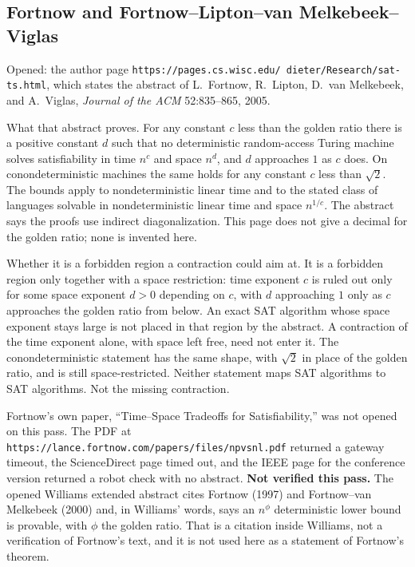 \documentclass{article}
\begin{document}
\subsection{Fortnow and Fortnow--Lipton--van Melkebeek--Viglas}
Opened: the author page \texttt{https://pages.cs.wisc.edu/~dieter/Research/sat-ts.html}, which states the abstract of L.~Fortnow, R.~Lipton, D.~van Melkebeek, and A.~Viglas, \emph{Journal of the ACM} 52:835--865, 2005.

What that abstract proves.
For any constant \(c\) less than the golden ratio there is a positive constant \(d\) such that no deterministic random-access Turing machine solves satisfiability in time \(n^c\) and space \(n^d\), and \(d\) approaches \(1\) as \(c\) does.
On conondeterministic machines the same holds for any constant \(c\) less than \(\sqrt{2}\).
The bounds apply to nondeterministic linear time and to the stated class of languages solvable in nondeterministic linear time and space \(n^{1/c}\).
The abstract says the proofs use indirect diagonalization.
This page does not give a decimal for the golden ratio; none is invented here.

Whether it is a forbidden region a contraction could aim at.
It is a forbidden region only together with a space restriction: time exponent \(c\) is ruled out only for some space exponent \(d>0\) depending on \(c\), with \(d\) approaching \(1\) only as \(c\) approaches the golden ratio from below.
An exact SAT algorithm whose space exponent stays large is not placed in that region by the abstract.
A contraction of the time exponent alone, with space left free, need not enter it.
The conondeterministic statement has the same shape, with \(\sqrt{2}\) in place of the golden ratio, and is still space-restricted.
Neither statement maps SAT algorithms to SAT algorithms.
Not the missing contraction.

Fortnow's own paper, ``Time--Space Tradeoffs for Satisfiability,'' was not opened on this pass.
The PDF at \texttt{https://lance.fortnow.com/papers/files/npvsnl.pdf} returned a gateway timeout, the ScienceDirect page timed out, and the IEEE page for the conference version returned a robot check with no abstract.
\textbf{Not verified this pass.}
The opened Williams extended abstract cites Fortnow (1997) and Fortnow--van Melkebeek (2000) and, in Williams' words, says an \(n^\phi\) deterministic lower bound is provable, with \(\phi\) the golden ratio.
That is a citation inside Williams, not a verification of Fortnow's text, and it is not used here as a statement of Fortnow's theorem.
\end{document}

